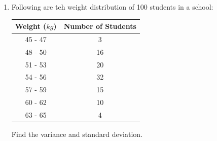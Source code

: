 \documentclass{report}
\begin{document}
\begin{multicols}{2}
\begin{enumerate}
    \item Following are teh weight distribution of 100 students in a school:
          \begin{center}
            \begin{tabular}{|c|c|}
              \hline
              Weight ($kg$) & Number of Students \\
              \hline
              45 - 47       & 3                  \\
              48 - 50       & 16                 \\
              51 - 53       & 20                 \\
              54 - 56       & 32                 \\
              57 - 59       & 15                 \\
              60 - 62       & 10                 \\
              63 - 65       & 4                  \\
              \hline
            \end{tabular}
          \end{center}
          Find the variance and standard deviation.
          \sol{}
          \begin{center}
\end{center}
\end{enumerate}
\end{multicols}
\end{document}
